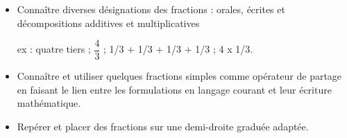 \begin{prerequis}    
    \begin{itemize}                
        \item[\emoji{red-heart}] Connaître diverses désignations des fractions : orales, écrites et décompositions additives et multiplicatives
        
        \smallskip
        ex : quatre tiers ; $\dfrac43$ ; 1/3 + 1/3 + 1/3 + 1/3 ; 4 x 1/3.
        \item[\emoji{red-heart}] Connaître et utiliser quelques fractions simples comme opérateur de partage en faisant le lien entre les formulations en langage courant et leur écriture mathématique.
        \columnbreak
        \item[\emoji{diamond-suit}] Repérer et placer des fractions sur une demi-droite graduée adaptée.
    \end{itemize}
\end{prerequis}
